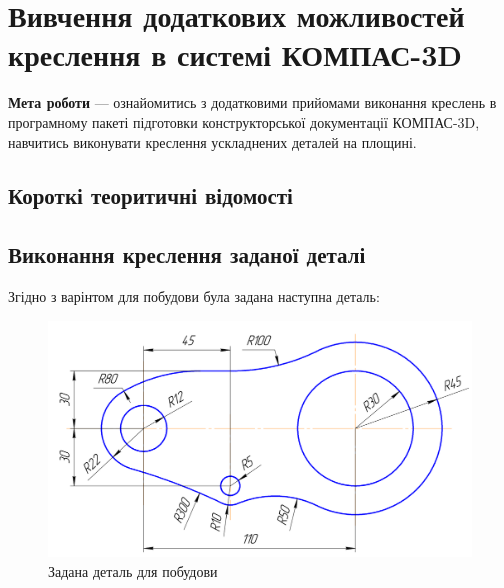 \chapter[~]{Вивчення додаткових можливостей креслення в системі КОМПАС-3D}

\textbf{Мета роботи} --- ознайомитись з додатковими прийомами виконання креслень в програмному
пакеті підготовки конструкторської документації КОМПАС-3D, навчитись виконувати креслення
ускладнених деталей на площині.

\section{Короткі теоритичні відомості}

\section{Виконання креслення заданої деталі}

Згідно з варінтом для побудови була задана наступна деталь:

\begin{figure}[!ht]
  \centering \includegraphics[width=0.9\linewidth]{./images/lab4/target_drawing.png}
  \caption{Задана деталь для побудови}
  \label{fig:lab3:target_part} 
\end{figure}
\FloatBarrier

